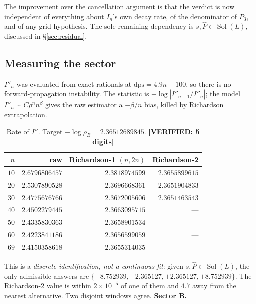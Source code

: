 \documentclass[11pt,reqno]{amsart}
\theoremstyle{plain}
\theoremstyle{definition}
\theoremstyle{remark}
\newcommand{\VER}[1]{{\normalfont\sffamily\bfseries[VERIFIED: #1]}}
\newcommand{\dps}{\mathrm{dps}}
\DeclareMathOperator{\Sol}{Sol}
\newcommand{\Phat}{\widehat{P}}
\begin{document}
The improvement over the cancellation argument is that the verdict is now independent of
everything about $I_n$'s own decay rate, of the denominator of $P_3$, and of any grid hypothesis.
The sole remaining dependency is $s,\Phat\in\Sol(L)$, discussed in \S\ref{sec:residual}.

\subsection{Measuring the sector}\label{sec:sectormeas}
$I''_n$ was evaluated from exact rationals at $\dps=4.9n+100$, so there is no
forward-propagation instability. The statistic is $-\log|I''_{n+1}/I''_n|$; the model
$I''_n\sim C\rho^n n^{\beta}$ gives the raw estimator a $-\beta/n$ bias, killed by Richardson
extrapolation.

\begin{table}[h]
\centering
\caption{Rate of $I''$. Target $-\log\rho_B=2.36512689845$. \VER{5 digits}}
\label{tab:sector}
\begin{tabular}{rrrr}
\toprule
$n$ & raw & Richardson-1 $(n,2n)$ & Richardson-2\\
\midrule
$10$ & $2.6796806457$ & $2.3818974599$ & $2.3655899615$\\
$20$ & $2.5307890528$ & $2.3696668361$ & $2.3651904833$\\
$30$ & $2.4775676766$ & $2.3672005606$ & $\mathbf{2.3651463543}$\\
$40$ & $2.4502279445$ & $2.3663095715$ & ---\\
$50$ & $2.4335830363$ & $2.3658901534$ & ---\\
$60$ & $2.4223841186$ & $2.3656599059$ & ---\\
$69$ & $2.4150358618$ & $\mathbf{2.3655314035}$ & ---\\
\bottomrule
\end{tabular}
\end{table}

This is a \emph{discrete identification, not a continuous fit}: given $s,\Phat\in\Sol(L)$, the only
admissible answers are $\{-8.752939,-2.365127,+2.365127,+8.752939\}$. The Richardson-2 value is
within $2\times10^{-5}$ of one of them and $4.7$ away from the nearest alternative. Two disjoint
windows agree. \textbf{Sector B.}
\end{document}
